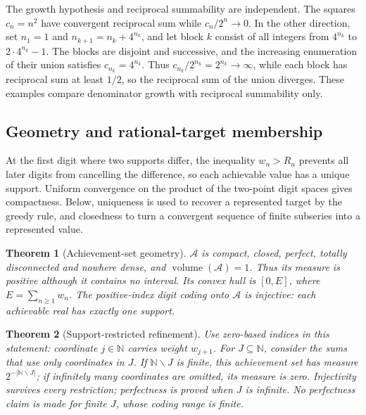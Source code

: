 \documentclass[11pt]{article}
\theoremstyle{plain}
\newtheorem{thm}{Theorem}[section]
\theoremstyle{definition}
\theoremstyle{remark}
\newcommand{\N}{\mathbb{N}}
\begin{document}
The growth hypothesis and reciprocal summability are independent. The
squares $c_n=n^2$ have convergent reciprocal sum while $c_n/2^n\to0$.  In the other direction,
set $n_1=1$ and $n_{k+1}=n_k+4^{n_k}$, and let block $k$ consist of
all integers from $4^{n_k}$ to $2\cdot4^{n_k}-1$. The blocks are disjoint
and successive, and the increasing enumeration of their union satisfies
$c_{n_k}=4^{n_k}$. Thus $c_{n_k}/2^{n_k}=2^{n_k}\to\infty$, while each
block has reciprocal sum at least $1/2$, so the reciprocal sum of the
union diverges. These examples compare denominator growth with
reciprocal summability only.

\subsection{Geometry and rational-target membership}
At the first digit where two supports differ, the inequality $w_n>R_n$
prevents all later digits from cancelling the difference, so each
achievable value has a unique support. Uniform convergence on the product
of the two-point digit spaces gives compactness. Below, uniqueness is
used to recover a represented target by the greedy rule, and closedness
to turn a convergent sequence of finite subseries into a represented
value.


\begin{thm}[Achievement-set geometry]
\label{thm:geometry}
$\mathcal{A}$ is compact, closed, perfect, totally disconnected and nowhere dense, and
$\operatorname{volume}(\mathcal{A}) = 1$.  Thus its measure is positive
although it contains no interval.  Its convex hull is $[0,E]$, where
$E=\sum_{n\ge1}w_n$.  The positive-index digit coding onto
$\mathcal{A}$ is injective: each achievable real has \emph{exactly one} support.
\end{thm}

\begin{thm}[Support-restricted refinement]
\label{thm:supported-dichotomy}
Use zero-based indices in this statement: coordinate $j\in\N$ carries
weight $w_{j+1}$.  For $J\subseteq\N$, consider the sums that use only
coordinates in $J$.  If $\N\smallsetminus J$ is finite, this achievement set
has measure $2^{-|\N\smallsetminus J|}$; if infinitely many coordinates are
omitted, its measure is zero.  Injectivity survives every restriction;
perfectness is proved when $J$ is infinite.  No perfectness claim is made for
finite $J$, whose coding range is finite.
\end{thm}
\end{document}
